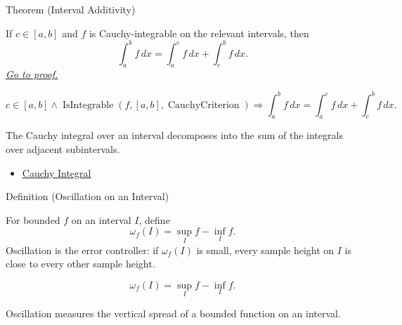\begin{theorembox}{Theorem (Interval Additivity)}
\begin{theorem}
\label{thm:cauchy-integral-interval-additivity}
If \(c\in[a,b]\) and \(f\) is Cauchy-integrable on the relevant intervals,
then
\[
  \int_a^b f\,dx=\int_a^c f\,dx+\int_c^b f\,dx .
\]
\hyperref[prf:cauchy-integral-interval-additivity]{\textit{Go to proof.}}
\end{theorem}
\end{theorembox}

\begin{remark*}
\[
c\in[a,b]\land
\operatorname{IsIntegrable}(f,[a,b],\operatorname{CauchyCriterion})
\Longrightarrow
\int_a^b f\,dx=\int_a^c f\,dx+\int_c^b f\,dx.
\]
\end{remark*}

\begin{remark*}[Interpretation]
The Cauchy integral over an interval decomposes into the sum of the integrals
over adjacent subintervals.
\end{remark*}

\begin{dependencies}
\begin{itemize}
  \item \hyperref[def:cauchy-integral]{Cauchy Integral}
\end{itemize}
\end{dependencies}

\begin{definitionbox}{Definition (Oscillation on an Interval)}
\begin{definition}
\label{def:interval-oscillation-integration}
For bounded \(f\) on an interval \(I\), define
\[
  \omega_f(I)=\sup_I f-\inf_I f.
\]
Oscillation is the error controller: if \(\omega_f(I)\) is small, every sample
height on \(I\) is close to every other sample height.
\end{definition}
\end{definitionbox}

\begin{remark*}
\[
\omega_f(I)=\sup_I f-\inf_I f.
\]
\end{remark*}

\begin{remark*}[Interpretation]
Oscillation measures the vertical spread of a bounded function on an interval.
\end{remark*}

